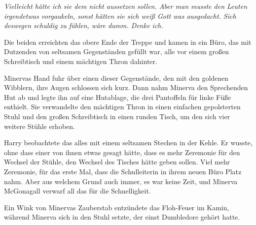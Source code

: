 \emph{Vielleicht hätte ich sie dem nicht aussetzen sollen. Aber man musste den Leuten \emph{irgendetwas} vorgaukeln, sonst hätten sie sich weiß Gott was ausgedacht. Sich deswegen schuldig zu fühlen, wäre dumm. Denke ich.}

Die beiden erreichten das obere Ende der Treppe und kamen in ein Büro, das mit Dutzenden von seltsamen Gegenständen gefüllt war, alle vor einem großen Schreibtisch und einem mächtigen Thron dahinter.

Minervas Hand fuhr über einen dieser Gegenstände, den mit den goldenen Wibblern, ihre Augen schlossen sich kurz.
Dann nahm Minerva den Sprechenden Hut ab und legte ihn auf eine Hutablage, die drei Pantoffeln für linke Füße enthielt. Sie verwandelte den mächtigen Thron in einen einfachen gepolsterten Stuhl und den großen Schreibtisch in einen runden Tisch, um den sich vier weitere Stühle erhoben.

Harry beobachtete das alles mit einem seltsamen Stechen in der Kehle. Er wusste, ohne dass einer von ihnen etwas gesagt hätte, dass es mehr Zeremonie für den Wechsel der Stühle, den Wechsel des Tisches hätte geben sollen. Viel mehr Zeremonie, für das erste Mal, dass die Schulleiterin in ihrem neuen Büro Platz nahm. Aber aus welchem Grund auch immer, es war keine Zeit, und Minerva McGonagall verwarf all das für die Schnelligkeit.

Ein Wink von Minervas Zauberstab entzündete das Floh-Feuer im Kamin, während Minerva sich in den Stuhl setzte, der einst Dumbledore gehört hatte.

